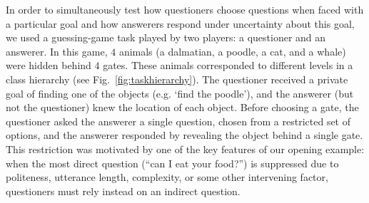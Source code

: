 \documentclass[12pt, floatsintext, jou]{apa6}
\begin{document}
%
%


In order to simultaneously test how questioners choose questions when faced with a particular goal and how answerers respond  under uncertainty about this goal, we used a guessing-game task played by two players: a questioner and an answerer. In this game, $4$ animals (a dalmatian, a poodle, a cat, and a whale) were hidden behind $4$ gates. These animals corresponded to different levels in a class hierarchy (see Fig.~\ref{fig:taskhierarchy}). The questioner received a private goal of finding one of the objects (e.g. `find the poodle'), and the answerer (but not the questioner) knew the location of each object. Before choosing a gate, the questioner asked the answerer a single question, chosen from a restricted set of options, and the answerer responded by revealing the object behind a single gate. This restriction was motivated by one of the key features of our opening example: when the most direct question (``can I eat your food?'') is suppressed due to politeness, utterance length, complexity, or some other intervening factor, questioners must rely instead on an indirect question. 
\end{document}
